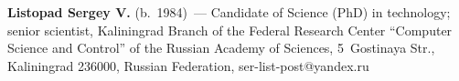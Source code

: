   \vspace*{3pt}
  
  \noindent
  \textbf{Listopad Sergey V.} (b.\ 1984)~--- Candidate of  Science (PhD) in 
technology; senior scientist, Kaliningrad Branch of the Federal Research Center 
``Computer Science and Control'' of the Russian Academy of Sciences, 5~Gostinaya 
Str., Kaliningrad 236000, Russian Federation, \mbox{ser-list-post@yandex.ru}
   
\label{end\stat}


\renewcommand{\bibname}{\protect\rm Литература} 